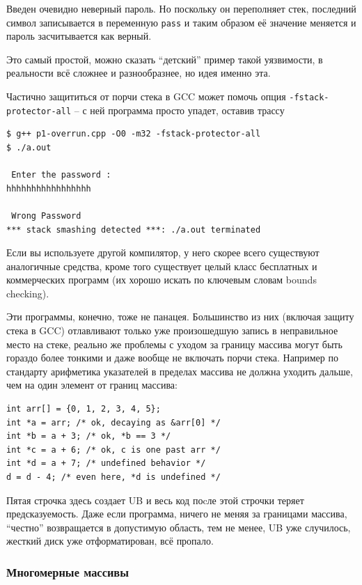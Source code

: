 \documentclass[a4paper,12pt,oneside]{article}
\begin{document}
Введен очевидно неверный пароль. Но поскольку он переполняет стек, последний символ записывается в переменную \lstinline!pass! и таким образом её значение меняется и пароль засчитывается как верный.

Это самый простой, можно сказать ``детский'' пример такой уязвимости, в реальности всё сложнее и разнообразнее, но идея именно эта.

Частично защититься от порчи стека в GCC может помочь опция \lstinline!-fstack-protector-all! -- с ней программа просто упадет, оставив трассу

\begin{verbatim}
$ g++ p1-overrun.cpp -O0 -m32 -fstack-protector-all
$ ./a.out 

 Enter the password : 
hhhhhhhhhhhhhhhhh

 Wrong Password 
*** stack smashing detected ***: ./a.out terminated
\end{verbatim}

Если вы используете другой компилятор, у него скорее всего существуют аналогичные средства, кроме того существует целый класс бесплатных и коммерческих программ (их хорошо искать по ключевым словам bounds checking).

Эти программы, конечно, тоже не панацея. Большинство из них (включая защиту стека в GCC) отлавливают только уже произошедшую запись в неправильное место на стеке, реально же проблемы с уходом за границу массива могут быть гораздо более тонкими и даже вообще не включать порчи стека. Например по стандарту арифметика указателей в пределах массива не должна уходить дальше, чем на один элемент от границ массива:

\begin{lstlisting}
int arr[] = {0, 1, 2, 3, 4, 5};
int *a = arr; /* ok, decaying as &arr[0] */
int *b = a + 3; /* ok, *b == 3 */
int *c = a + 6; /* ok, c is one past arr */
int *d = a + 7; /* undefined behavior */
d = d - 4; /* even here, *d is undefined */
\end{lstlisting}

Пятая строчка здесь создает UB и весь код поcле этой строчки теряет предсказуемость. Даже если программа, ничего не меняя за границами массива, ``честно'' возвращается в допустимую область, тем не менее, UB уже случилось, жесткий диск уже отформатирован, всё пропало.

\subsubsection{Многомерные массивы}\label{MultiDimArr}
\end{document}
